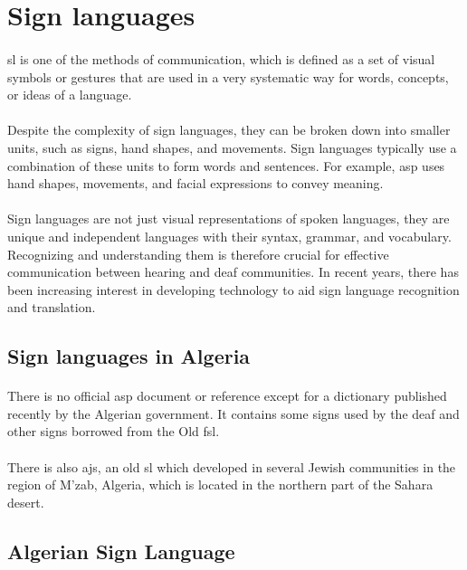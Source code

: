 \section{Sign languages}
\paragraph{}
\ac{sl} is one of the methods of communication, which is defined as a set of visual symbols or gestures that are used in a very systematic way for words, concepts, or ideas of a language.\cite{teaching}
\paragraph{}
Despite the complexity of sign languages, they can be broken down into smaller units, such as signs, hand shapes, and movements. Sign languages typically use a combination of these units to form words and sentences. For example, \ac{asp} uses hand shapes, movements, and facial expressions to convey meaning.
\paragraph{}
Sign languages are not just visual representations of spoken languages, they are unique and independent languages with their syntax, grammar, and vocabulary. Recognizing and understanding them is therefore crucial for effective communication between hearing and deaf communities. In recent years, there has been increasing interest in developing technology to aid sign language recognition and translation.
\subsection{Sign languages in Algeria}
\paragraph{}
There is no official \ac{asp} document or reference except for a dictionary published recently by the Algerian government. It contains some signs used by the deaf and other signs borrowed from the Old \ac{fsl}.\cite{chalenges}
\paragraph{}
There is also \ac{ajs}, an old \ac{sl} which developed in several Jewish communities in the region of M’zab, Algeria, which is located in the northern part of the Sahara desert.\cite{sara}
\subsection{Algerian Sign Language}
